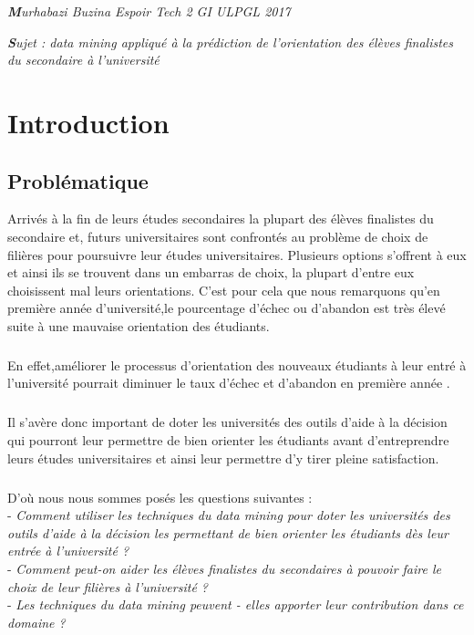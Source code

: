 \begin{center}
	\textit{ \textbf Murhabazi Buzina Espoir Tech 2 GI ULPGL 2017}
\end{center}
\begin{center}
	 \textit{ \textbf Sujet : data mining appliqué à la prédiction de l'\textbf{}orientation des élèves finalistes du secondaire à l'université }
\end{center}
\chapter*{Introduction}
\section{Problématique}
Arrivés à la fin de leurs études secondaires la plupart des élèves finalistes du secondaire et, futurs universitaires sont confrontés au problème de choix de filières pour poursuivre leur études universitaires.
Plusieurs options s'offrent à eux et ainsi ils se trouvent dans un embarras de choix, la plupart d'entre eux choisissent mal leurs orientations.
C'est pour cela que nous remarquons qu'en première année d'université,le pourcentage d'échec ou d'abandon est très élevé suite à une mauvaise orientation des étudiants.\cite{Articl1Mr} 
\paragraph{}
En effet,améliorer le processus d'orientation des nouveaux étudiants à leur entré à l'université pourrait diminuer le taux d'échec et d'abandon en première année .
\paragraph{}
Il s'avère donc important de doter les universités des outils d'aide à la décision qui pourront leur permettre de bien orienter les étudiants avant d'entreprendre leurs études universitaires et ainsi leur permettre d'y tirer pleine satisfaction.  
\paragraph{}
D'où nous nous sommes posés les questions suivantes : \\
- \emph{Comment utiliser les techniques  du data mining pour doter les universités des outils d'aide à la décision les permettant de bien orienter les étudiants dès leur entrée à l'université ?  }\\
- \emph{Comment peut-on aider les élèves finalistes du secondaires  à pouvoir faire le choix de leur filières à l'université ? }\\
- \emph{Les techniques du data mining peuvent - elles apporter leur contribution dans ce domaine ? }

